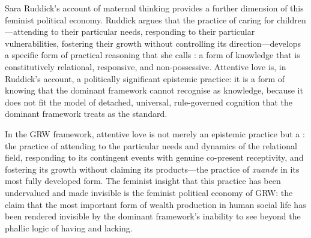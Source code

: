 Sara Ruddick's account of maternal thinking \parencite{ruddick1989} provides a further dimension of this feminist political economy. Ruddick argues that the practice of caring for children---attending to their particular needs, responding to their particular vulnerabilities, fostering their growth without controlling its direction---develops a specific form of practical reasoning that she calls : a form of knowledge that is constitutively relational, responsive, and non-possessive. Attentive love is, in Ruddick's account, a politically significant epistemic practice: it is a form of knowing that the dominant framework cannot recognise as knowledge, because it does not fit the model of detached, universal, rule-governed cognition that the dominant framework treats as the standard.

In the GRW framework, attentive love is not merely an epistemic practice but a : the practice of attending to the particular needs and dynamics of the relational field, responding to its contingent events with genuine co-present receptivity, and fostering its growth without claiming its products---the practice of \emph{xuande} in its most fully developed form. The feminist insight that this practice has been undervalued and made invisible is the feminist political economy of GRW: the claim that the most important form of wealth production in human social life has been rendered invisible by the dominant framework's inability to see beyond the phallic logic of having and lacking.
